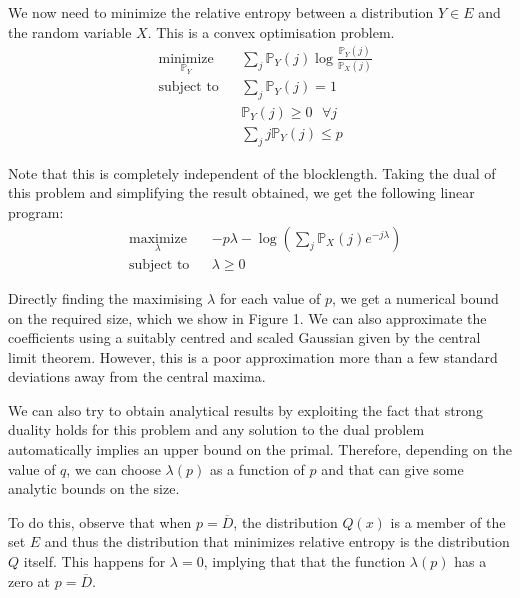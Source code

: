 \documentclass[conference,letterpaper]{IEEEtran}
\begin{document}
We now need to minimize the relative entropy between a distribution $Y \in E$ and the random variable $X$. This is a convex optimisation problem.
\begin{equation}
\begin{aligned}
& \underset{\mathbb{P}_Y}{\text{minimize}}
& & \sum_j \mathbb{P}_Y(j) \log \frac{\mathbb{P}_Y(j)}{\mathbb{P}_X(j)} \\
& \text{subject to}
& & \sum_j \mathbb{P}_Y(j) = 1\\
&&& \mathbb{P}_Y(j) \geq 0 \text{  } \forall j\\
&&& \sum_j j \mathbb{P}_Y(j) \leq p
\end{aligned}
\end{equation}

Note that this is completely independent of the blocklength. Taking the dual of this problem and simplifying the result obtained, we get the following linear program:
\begin{equation}
\begin{aligned}
& \underset{\lambda}{\text{maximize}}
& & -p \lambda - \log \left(\sum_j \mathbb{P}_X(j) e^{-j \lambda}\right) \\
& \text{subject to}
& & \lambda \geq 0
\end{aligned}
\end{equation}

Directly finding the maximising $\lambda$ for each value of $p$, we get a numerical bound on the required size, which we show in Figure 1. We can also approximate the coefficients using a suitably centred and scaled Gaussian given by the central limit theorem. However, this is a poor approximation more than a few standard deviations away from the central maxima.

We can also try to obtain analytical results by exploiting the fact that strong duality holds for this problem and any solution to the dual problem automatically implies an upper bound on the primal. Therefore, depending on the value of $q$, we can choose $\lambda(p)$ as a function of $p$ and that can give some analytic bounds on the size. 

To do this, observe that when $p = \overline{D}$, the distribution $Q(x)$ is a member of the set $E$ and thus the distribution that minimizes relative entropy is the distribution $Q$ itself. This happens for $\lambda = 0$, implying that that the function $\lambda(p)$ has a zero at $p = \overline{D}$.
\end{document}
